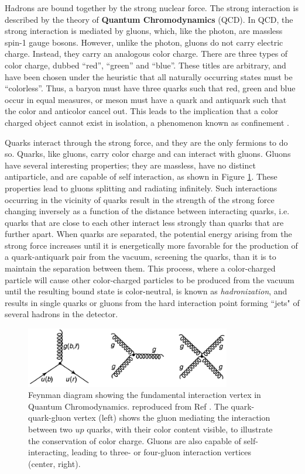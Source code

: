 \documentclass[12pt,a4paper,openright,twoside]{report}
\begin{document}
Hadrons are bound together by the strong nuclear force. The strong interaction is described by the theory of \textbf{Quantum Chromodynamics} (QCD). In QCD, the strong interaction is mediated by gluons, which, like the photon, are massless spin-1 gauge bosons. However, unlike the photon, gluons do not carry electric charge. Instead, they carry an analogous color charge. There are three types of color charge, dubbed ``red'', ``green'' and ``blue''. These titles are arbitrary, and have been chosen under the heuristic that all naturally occurring states must be ``colorless''. Thus, a baryon must have three quarks such that red, green and blue occur in equal measures, or meson must have a quark and antiquark such that the color and anticolor cancel out. This leads to the implication that a color charged object cannot exist in isolation, a phenomenon known as confinement \cite{confinement}.

Quarks interact through the strong force, and they are the only fermions to do so. Quarks, like gluons, carry color charge and can interact with gluons. Gluons have several interesting properties; they are massless, have no distinct antiparticle, and are capable of self interaction, as shown in Figure \ref{fig:qcd_fund_vertex}. These properties lead to gluons splitting and radiating infinitely. Such interactions occurring in the vicinity of quarks result in the strength of the strong force changing inversely as a function of the distance between interacting quarks, i.e. quarks that are close to each other interact less strongly than quarks that are further apart. When quarks are separated, the potential energy arising from the strong force increases until it is energetically more favorable for the production of a quark-antiquark pair from the vacuum, screening the quarks, than it is to maintain the separation between them. This process, where a color-charged particle will cause other color-charged particles to be produced from the vacuum until the resulting bound state is color-neutral, is known as \textit{hadronization}, and results in single quarks or gluons from the hard interaction point forming ``jets" of several hadrons in the detector.

\begin{figure}[h]
\centering
\includegraphics[width = 0.8\textwidth]{fundamental_vertex_qcd.png}
\caption{Feynman diagram showing the fundamental interaction vertex in Quantum Chromodynamics. reproduced from Ref \cite{griff}. The quark-quark-gluon vertex (left) shows the gluon mediating the interaction between two $up$ quarks, with their color content visible, to illustrate the conservation of color charge. Gluons are also capable of self-interacting, leading to three- or four-gluon interaction vertices (center, right).}
\label{fig:qcd_fund_vertex}
\end{figure}
\end{document}
